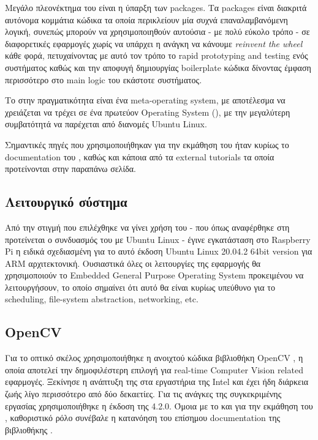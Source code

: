 Μεγάλο πλεονέκτημα του  είναι η ύπαρξη των packages. Τα packages είναι δια\-κρι\-τά αυτόνομα κομμάτια κώδικα τα οποία περικλείουν μία συχνά επαναλαμβανόμενη λογική, συνεπώς μπορούν να χρησιμοποιηθούν αυτούσια - με πολύ εύκολο τρόπο - σε διαφορετικές εφαρμογές χωρίς να υπάρχει η ανάγκη να κάνουμε \textit{reinvent the wheel} κάθε φορά, πετυχαίνοντας με αυτό τον τρόπο το rapid prototyping and testing ενός συστήματος καθώς και την αποφυγή δημιουργίας boilerplate κώδικα δίνοντας έμφαση περισσότερο στο main logic του εκάστοτε συστήματος. 

Το  στην πραγματικότητα είναι ένα meta-operating system, με αποτέλεσμα να χρειάζεται να τρέχει σε ένα πρωτεύον Operating System (), με την μεγαλύτερη συμβατότητά να παρέχεται από διανομές Ubuntu Linux. 

Σημαντικές πηγές που χρησιμοποιήθηκαν για την εκμάθηση του  ήταν κυρίως το documentation του \cite{ros-doc}, καθώς και κάποια από τα external tutorials τα οποία προτείνονται στην παραπάνω σελίδα.


\subsection{Λειτουργικό σύστημα}
Από την στιγμή που επιλέχθηκε να γίνει χρήση του  - που όπως αναφέρθηκε στη  προτείνεται ο συνδυασμός του με Ubuntu Linux - έγινε ε\-γκα\-τά\-στα\-ση στο Raspberry Pi η ειδικά σχεδιασμένη για το αυτό έκδοση Ubuntu Linux 20.04.2 64bit version για ΑRM \cite{ubuntu-raspberry} αρχιτεκτονική. Ουσιαστικά όλες οι λειτουργίες της εφαρμογής θα χρησιμοποιούν το Embedded General Purpose Operating System προκειμένου να λειτουργήσουν, το οποίο σημαίνει ότι αυτό θα είναι κυρίως υπεύθυνο για το scheduling, file-system abstraction, networking, etc. 


\subsection{OpenCV}
Για το οπτικό σκέλος χρησιμοποιήθηκε η ανοιχτού κώδικα βιβλιοθήκη OpenCV \cite{opencv}, η οποία αποτελεί την δημοφιλέστερη επιλογή για real-time Computer Vision related εφαρμογές. Ξεκίνησε η ανάπτυξη της στα εργαστήρια της Intel και έχει ήδη διάρκεια ζωής λίγο περισσότερο από δύο δεκαετίες. Για τις ανάγκες της συγκεκριμένης ε\-ργα\-σίας χρησιμοποιήθηκε η έκδοση της 4.2.0. Όμοια με το  και για την εκμάθηση του , καθοριστικό ρόλο συνέβαλε η κατανόηση του επίσημου documentation της βιβλιοθήκης \cite{opencv-4-2-0-doc}.

